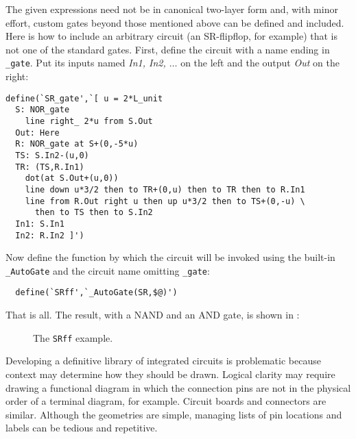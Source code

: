 The given expressions
need not be in canonical two-layer form and, with minor effort, custom
gates beyond those mentioned above can be defined and included.
Here is how to include an arbitrary circuit (an SR-flipflop, for example)
that is not one of the standard gates.
First, define the circuit with a name ending
in {\tt \_gate}.  Put its inputs named {\sl In1, In2, $\ldots$}
on the left and the output {\sl Out} on the right:
\begin{verbatim}
define(`SR_gate',`[ u = 2*L_unit
  S: NOR_gate
    line right_ 2*u from S.Out
  Out: Here
  R: NOR_gate at S+(0,-5*u)
  TS: S.In2-(u,0)
  TR: (TS,R.In1)
    dot(at S.Out+(u,0))
    line down u*3/2 then to TR+(0,u) then to TR then to R.In1
    line from R.Out right u then up u*3/2 then to TS+(0,-u) \
      then to TS then to S.In2
  In1: S.In1
  In2: R.In2 ]')
\end{verbatim}

Now define the function by which the circuit
will be invoked using the built-in {\tt \_AutoGate} and the circuit name
omitting {\tt \_gate}:
\begin{verbatim}
  define(`SRff',`_AutoGate(SR,$@)')
\end{verbatim}
That is all.  The result, with a NAND and an AND gate, is shown in :
\begin{figure}[H]
   
   \caption{The {\tt SRff} example.}
   \label{SRff}
   \end{figure}

Developing a definitive library of integrated circuits is problematic
because context may determine how they should be drawn.  Logical clarity
may require drawing a functional diagram in which the connection pins are
not in the physical order of a terminal diagram, for example.  Circuit
boards and connectors are similar. Although the geometries are simple,
managing lists of pin locations and labels can be tedious and repetitive.

